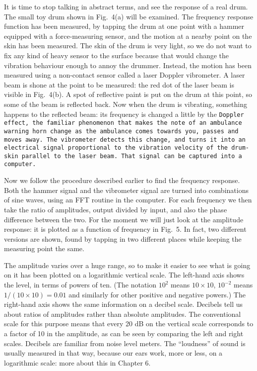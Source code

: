 

  It is time to stop talking in abstract terms, and see the response of a real 
  drum. The small toy drum shown in Fig.\ 4(a) will be examined. The frequency 
  response function has been measured, by tapping the drum at one point with a 
  hammer equipped with a force-measuring sensor, and the motion at a nearby 
  point on the skin has been measured. The skin of the drum is very light, so 
  we do not want to fix any kind of heavy sensor to the surface because that 
  would change the vibration behaviour enough to annoy the drummer. Instead, 
  the motion has been measured using a non-contact sensor called a laser 
  Doppler vibrometer. A laser beam is shone at the point to be measured: the 
  red dot of the laser beam is visible in Fig.\ 4(b). A spot of reflective 
  paint is put on the drum at this point, so some of the beam is reflected 
  back. Now when the drum is vibrating, something happens to the reflected 
  beam: its frequency is changed a little by the \tt{}Doppler effect\rm{}, the 
  familiar phenomenon that makes the note of an ambulance warning horn change 
  as the ambulance comes towards you, passes and moves away. The vibrometer 
  detects this change, and turns it into an electrical signal proportional to 
  the vibration velocity of the drum-skin parallel to the laser beam. That 
  signal can be captured into a computer. 

  Now we follow the procedure described earlier to find the frequency response. 
  Both the hammer signal and the vibrometer signal are turned into combinations 
  of sine waves, using an FFT routine in the computer. For each frequency we 
  then take the ratio of amplitudes, output divided by input, and also the 
  phase difference between the two. For the moment we will just look at the 
  amplitude response: it is plotted as a function of frequency in Fig.\ 5. In 
  fact, two different versions are shown, found by tapping in two different 
  places while keeping the measuring point the same. 

  The amplitude varies over a huge range, so to make it easier to see what is 
  going on it has been plotted on a logarithmic vertical scale. The left-hand 
  axis shows the level, in terms of powers of ten. (The notation $10^2$ means 
  $10 \times 10$, $10^{-2}$ means $1/(10 \times 10)=0.01$ and similarly for 
  other positive and negative powers.) The right-hand axis shows the same 
  information on a decibel scale. Decibels tell us about ratios of amplitudes 
  rather than absolute amplitudes. The conventional scale for this purpose 
  means that every 20 dB on the vertical scale corresponds to a factor of 10 in 
  the amplitude, as can be seen by comparing the left and right scales. 
  Decibels are familiar from noise level meters. The ``loudness'' of sound is 
  usually measured in that way, because our ears work, more or less, on a 
  logarithmic scale: more about this in Chapter 6. 

